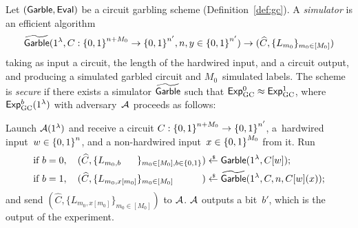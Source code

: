 \begin{definition}\label{def:gc-security}
Let $({\smash{\mathsf{Garble}}},{\smash{\mathsf{Eval}}})$ be a circuit garbling scheme (Definition~\ref{def:gc}).
A \emph{simulator} is an efficient algorithm
\begin{align*}
{\widetilde{\mathsf{Garble}}}(1^\lambda,C:{\{0,1\}}^{n+M_0}\to{\{0,1\}}^{n'},n,y\in{\{0,1\}}^{n'})
\to
(\widehat{C},\{L_{m_0}\}_{m_0\in[M_0]})
\end{align*}
taking as input a circuit, the length of the hardwired input, and a circuit output,
and producing a simulated garbled circuit and $M_0$~simulated labels.
The scheme is \emph{secure} if there exists a simulator ${\widetilde{\mathsf{Garble}}}$ such that ${{\smash{\mathsf{Exp}}_{\textup{GC}}^{0}}\approx{\smash{\mathsf{Exp}}_{\textup{GC}}^{1}}}$, where ${\smash{\mathsf{Exp}}_{\textup{GC}}^{b}}(1^\lambda)$ with adversary~${\mathcal{A}}$ proceeds as follows:
\begin{security}
Launch ${\mathcal{A}}(1^\lambda)$ and receive
a circuit ${C:{\{0,1\}}^{n+M_0}\to{\{0,1\}}^{n'}}$,
a~hardwired input~${w\in{\{0,1\}}^n}$, and
a non-hardwired input~${x\in{\{0,1\}}^{M_0}}$
from it.
Run
\begin{align*}
\textup{if }b=0,\quad
(\widehat{C},\{L_{m_0,\mathrlap{b}\phantom{x[m_0]}}\}_{m_0\in[M_0],b\in\bit})
&{}\draws\Garble(1^\lambda,C[w]);\\
\textup{if }b=1,\quad
(\widehat{C},\{L_{m_0,x[m_0]}\}_{m_0\in[M_0]\phantom{,b\in\bit}})
&{}\draws\SimGarble(1^\lambda,C,n,C[w](x));
\end{align*}
and send $(\widehat{C},\{L_{m_0,x[m_0]}\}_{m_0\in[M_0]})$ to ${\mathcal{A}}$.
${\mathcal{A}}$ outputs a bit~$b'$, which is the output of the experiment.
\end{security}
\end{definition}
